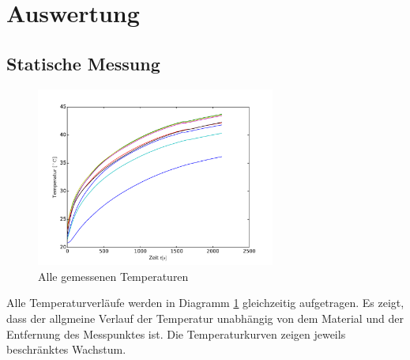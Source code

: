 \section{Auswertung}
\label{sec:Auswertung}
\subsection{Statische Messung}
\begin{figure}[h!]
	\label{fig:overview1}
	\centering
	\includegraphics[width=0.7\textwidth]{Bilder/M1_Overview.pdf}
	\caption{Alle gemessenen Temperaturen}
\end{figure}
Alle Temperaturverläufe werden in Diagramm \ref{fig:overview1} gleichzeitig aufgetragen. Es zeigt, dass der allgmeine Verlauf der Temperatur unabhängig von dem Material und der Entfernung des Messpunktes ist. Die Temperaturkurven zeigen jeweils beschränktes Wachstum.

